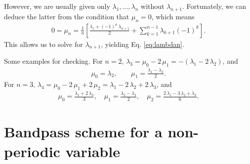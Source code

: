 \documentclass[preprint, floatfix]{revtex4-1}
\begin{document}
{  However, we are usually given only $\lambda_1, \dots, \lambda_n$
  without $\lambda_{n + 1}$.
  Fortunately, we can deduce the latter from
  the condition that $\mu_n = 0$, which means
  $$
  \begin{aligned}
    0 = \mu_n
    =
    \frac{1}{n}
    \left[
      \frac{ \lambda_1 + (-1)^n \, \lambda_{n+1} }
           {               2                     }
      +
      \sum_{ k = 1 }^{ n - 1 }
      \lambda_{k+1} (-1)^k
    \right].
  \end{aligned}
  $$
  This allows us to solve for $\lambda_{ n + 1 }$,
  yielding Eq. \eqref{eq:lambdan}.


  Some examples for checking.
  For $n = 2$,
  $\lambda_3
  = \mu_0 - 2 \, \mu_1
  = -(\lambda_1 - 2 \, \lambda_2)$,
  and
  $$
  \begin{aligned}
  \mu_0
  =
  \lambda_2,
  \qquad
  \mu_1
  =
  \frac{ \lambda_1 - \lambda_2 }
       {           2           }
  .
  \end{aligned}
  $$
  For $n = 3$,
  $\lambda_4
  = \mu_0 - 2 \, \mu_1 + 2 \, \mu_2
  = \lambda_1 - 2 \, \lambda_2 + 2 \, \lambda_3$,
  and
  $$
  \begin{aligned}
  \mu_0
  =
  \frac{ \lambda_1 + 2 \, \lambda_3 } { 3 }
  ,
  \quad
  \mu_1
  =
  \frac{ \lambda_2 - \lambda_3 } { 2 }
  ,
  \quad
  \mu_2
  =
  \frac { 2 \, \lambda_1 - 3 \, \lambda_2 + \lambda_3 } { 6 }
  .
  \end{aligned}
  $$
}



\section{Bandpass scheme for a non-periodic variable}
\end{document}
